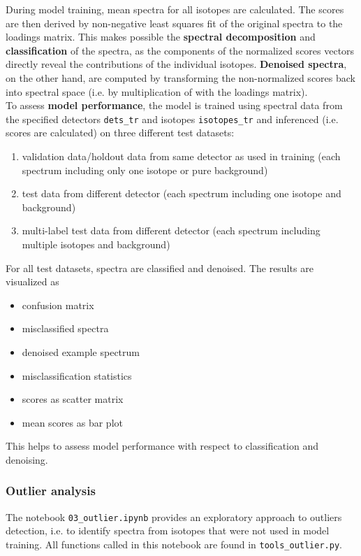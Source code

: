 \documentclass[preprint,12pt, a4paper]{elsarticle}
\begin{document}
During model training, mean spectra for all isotopes are calculated. The scores are then derived by non-negative least squares fit of the original spectra to the loadings matrix. This makes possible the \textbf{spectral decomposition} and \textbf{classification} of the spectra, as the components of the normalized scores vectors directly reveal the contributions of the individual isotopes. \textbf{Denoised spectra}, on the other hand, are computed by transforming the non-normalized scores back into spectral space (i.e. by multiplication of with the loadings matrix). \\

To assess \textbf{model performance}, the model is trained using spectral data from the specified detectors \texttt{dets\_tr} and isotopes \texttt{isotopes\_tr} and inferenced (i.e. scores are calculated) on three different test datasets:
\begin{enumerate}
\item validation data/holdout data from same detector as used in training (each spectrum including 
only one isotope or pure background)
\item test data from different detector (each spectrum including one isotope and background)
\item multi-label test data from different detector (each spectrum including multiple isotopes and background)
\end{enumerate}


For all test datasets, spectra are classified and denoised. The results are visualized as 
\begin{itemize}
\item confusion matrix  
\item misclassified spectra  
\item denoised example spectrum  
\item misclassification statistics  
\item scores as scatter matrix  
\item mean scores as bar plot
\end{itemize}
  
This helps to assess model performance with respect to classification and denoising. 

\subsubsection{Outlier analysis}
The notebook \texttt{03\_outlier.ipynb} provides an exploratory approach to outliers detection, i.e. to identify spectra from isotopes that were not used in model training. All functions called in this notebook are found in \texttt{tools\_outlier.py}. 
\end{document}
